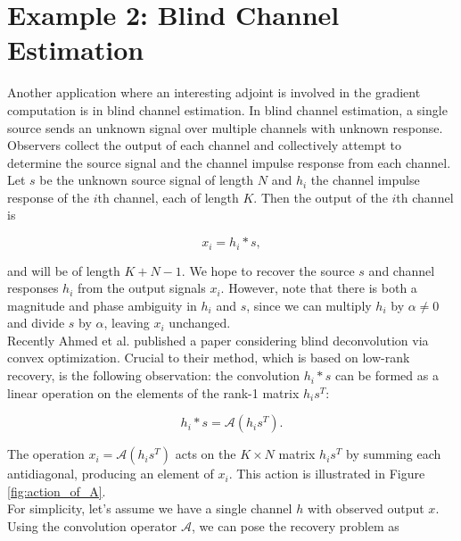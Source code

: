\documentclass[journal]{IEEEtran}
\begin{document}


\section{Example 2: Blind Channel Estimation}
Another application where an interesting adjoint is involved in the gradient computation is in blind channel estimation.  In blind channel estimation, a single source sends an unknown signal over multiple channels with unknown response.  Observers collect the output of each channel and collectively attempt to determine the source signal and the channel impulse response from each channel.  Let $s$ be the unknown source signal of length $N$ and $h_i$ the channel impulse response of the $i$th channel, each of length $K$.  Then the output of the $i$th channel is

\[ x_i = h_i\ast s, \] 

\noindent and will be of length $K+N-1$.  We hope to recover the source $s$ and channel responses $h_i$ from the output signals $x_i$.   However, note that there is both a magnitude and phase ambiguity in $h_i$ and $s$, since we can multiply $h_i$ by $\alpha\neq 0$ and divide $s$ by $\alpha$, leaving $x_i$ unchanged.\\

Recently Ahmed et al. \cite{ahmed_2013} published a paper considering blind deconvolution via convex optimization.  Crucial to their method, which is based on low-rank recovery, is the following observation: the convolution $h_i\ast s$ can be formed as a linear operation on the elements of the rank-1 matrix $h_is^T$:

\[ h_i\ast s = \mathcal{A}(h_is^T). \] 

\noindent The operation $x_i=\mathcal{A}(h_is^T)$ acts on the $K\times N$ matrix $h_is^T$ by summing each antidiagonal, producing an element of $x_i$.  This action is illustrated in Figure \ref{fig:action_of_A}.\\

For simplicity, let's assume we have a single channel $h$ with observed output $x$.  Using the convolution operator $\mathcal{A}$, we can pose the recovery problem as
\end{document}
